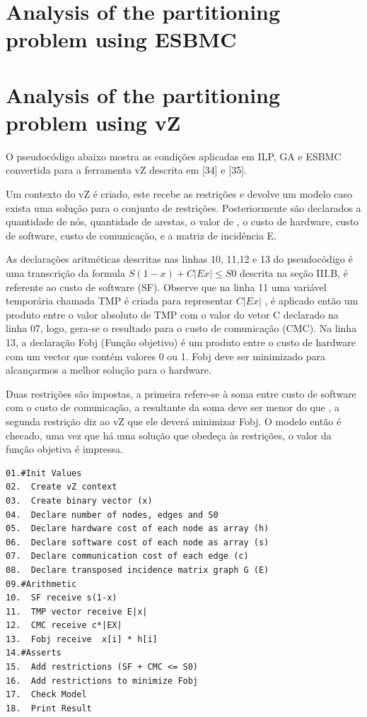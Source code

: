 \section{Analysis of the partitioning problem using ESBMC}
\section{Analysis of the partitioning problem using vZ}
O pseudocódigo abaixo mostra as condições aplicadas em ILP, GA e ESBMC convertida para a ferramenta vZ descrita em [34] e [35]. 

Um contexto do vZ é criado, este recebe as restrições e devolve um modelo caso exista uma solução para o conjunto de restrições.  Posteriormente são declarados a quantidade de nós, quantidade de arestas, o valor de , o custo de hardware, custo de software, custo de comunicação, e a matriz de incidência E.   

As declarações aritméticas descritas nas linhas 10, 11,12 e 13 do pseudocódigo é uma transcrição da formula $ S(1-x) + C|Ex| \leq S{0} $ descrita na seção III.B, é referente ao custo de software (SF). Observe que na linha 11 uma variável temporária chamada TMP é criada para representar $C|Ex|$  , é aplicado então um produto entre o valor absoluto de TMP com o valor do vetor C declarado na linha 07, logo, gera-se o resultado para o custo de comunicação (CMC). 
Na linha 13, a declaração Fobj (Função objetivo) é um produto entre o custo de hardware com um vector que contém valores 0 ou 1. Fobj deve ser minimizado para alcançarmos a melhor solução para o hardware.

Duas restrições são impostas, a primeira refere-se à soma entre custo de software com o custo de comunicação, a resultante da soma deve ser menor do que , a segunda restrição diz ao vZ que ele deverá minimizar Fobj. O modelo então é checado, uma vez que há uma solução que obedeça às restrições, o valor da função objetiva é impressa. 

\begin{lstlisting}
01.#Init Values
02.  Create vZ context 
03.  Create binary vector (x)
04.  Declare number of nodes, edges and S0
05.  Declare hardware cost of each node as array (h) 
06.  Declare software cost of each node as array (s)
07.  Declare communication cost of each edge (c)
08.  Declare transposed incidence matrix graph G (E)
09.#Arithmetic
10.  SF receive s(1-x)
11.  TMP vector receive E|x| 
12.  CMC receive c*|EX|
13.  Fobj receive  x[i] * h[i]
14.#Asserts
15.  Add restrictions (SF + CMC <= S0)
16.  Add restrictions to minimize Fobj
17.  Check Model
18.  Print Result
\end{lstlisting}


